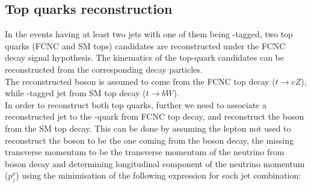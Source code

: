 \subsection {Top quarks reconstruction}
\label{sec:sel:topmassrec}
In the events having at least two jets with one of them being \Pqb-tagged, two top quarks (FCNC and SM tops) candidates are reconstructed under the FCNC \ttbar decay signal hypothesis.
The kinematics of the top-quark candidates can be reconstructed from
the corresponding decay particles.\\
The reconstructed \PZ boson is assumed to come from the FCNC top decay ($t\to cZ$),
while \Pqb-tagged jet from SM top decay ($t\to bW$).\\
In order to reconstruct both top quarks, 
further we need to associate a reconstructed jet to the \Pqc-quark from FCNC top decay, and reconstruct
the \PW boson from the SM top decay. This can be done by assuming the lepton not used to reconstruct the \PZ boson to be the one coming from the \PW boson decay,
the missing transverse momentum to be the transverse momentum of the neutrino from \PW boson decay
and determining longitudinal component of the neutrino momentum ($p^{\nu}_z$)
using the minimisation of the following expression for each jet combination:

